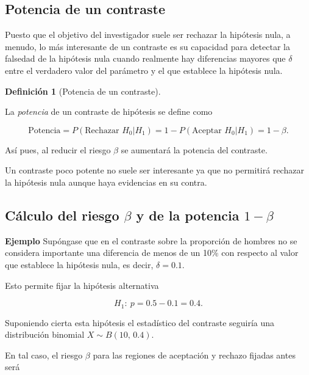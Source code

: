 \documentclass[
  a4paper,
]{scrreport}
\theoremstyle{definition}
\newtheorem{definition}{Definición}[chapter]
\theoremstyle{definition}
\theoremstyle{plain}
\theoremstyle{remark}
\begin{document}
\hypertarget{potencia-de-un-contraste}{%
\subsection{Potencia de un contraste}\label{potencia-de-un-contraste}}

Puesto que el objetivo del investigador suele ser rechazar la hipótesis
nula, a menudo, lo más interesante de un contraste es su capacidad para
detectar la falsedad de la hipótesis nula cuando realmente hay
diferencias mayores que \(\delta\) entre el verdadero valor del
parámetro y el que establece la hipótesis nula.

\begin{definition}[Potencia de un
contraste]\protect\hypertarget{def-potencia-contraste}{}\label{def-potencia-contraste}

La \emph{potencia} de un contraste de hipótesis se define como

\[
\mbox{Potencia} = P(\mbox{Rechazar }H_0|H_1) = 1 - P(\mbox{Aceptar }H_0|H_1) = 1-\beta.
\]

\end{definition}

Así pues, al reducir el riesgo \(\beta\) se aumentará la potencia del
contraste.

Un contraste poco potente no suele ser interesante ya que no permitirá
rechazar la hipótesis nula aunque haya evidencias en su contra.

\hypertarget{cuxe1lculo-del-riesgo-beta-y-de-la-potencia-1-beta}{%
\subsection{\texorpdfstring{Cálculo del riesgo \(\beta\) y de la
potencia
\(1-\beta\)}{Cálculo del riesgo \textbackslash beta y de la potencia 1-\textbackslash beta}}\label{cuxe1lculo-del-riesgo-beta-y-de-la-potencia-1-beta}}

\textbf{Ejemplo} Supóngase que en el contraste sobre la proporción de
hombres no se considera importante una diferencia de menos de un 10\%
con respecto al valor que establece la hipótesis nula, es decir,
\(\delta=0.1\).

Esto permite fijar la hipótesis alternativa

\[H_1:\ p=0.5-0.1=0.4.\]

Suponiendo cierta esta hipótesis el estadístico del contraste seguiría
una distribución binomial \(X\sim B(10,\,0.4)\).

En tal caso, el riesgo \(\beta\) para las regiones de aceptación y
rechazo fijadas antes será
\end{document}
